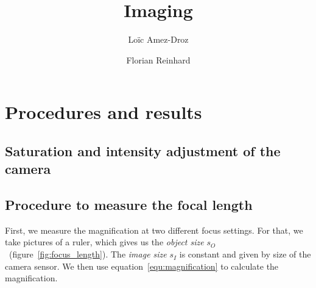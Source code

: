 \documentclass[a4paper, 12pt]{paper}
\author{Loïc Amez-Droz \and Florian Reinhard}
\title{Imaging}
\begin{document}

\section{Procedures and results}
\subsection{Saturation and intensity adjustment of the camera}
\subsection{Procedure to measure the focal length}

First, we measure the magnification at two different focus settings.
For that, we take pictures of a ruler, which gives us the \emph{object size} $s_O$~(figure~\ref{fig:focus_length}).
The \emph{image size} $s_I$ is constant and given by size of the camera sensor.
We then use equation~\ref{equ:magnification} to calculate the magnification.
\end{document}
